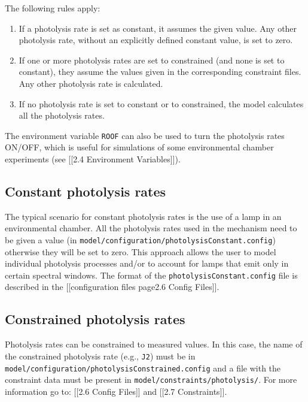 The following rules apply:

\begin{enumerate}
\def\labelenumi{\arabic{enumi}.}
\item
  If a photolysis rate is set as constant, it assumes the given value.
  Any other photolysis rate, without an explicitly defined constant
  value, is set to zero.
\item
  If one or more photolysis rates are set to constrained (and none is
  set to constant), they assume the values given in the corresponding
  constraint files. Any other photolysis rate is calculated.
\item
  If no photolysis rate is set to constant or to constrained, the model
  calculates all the photolysis rates.
\end{enumerate}

The environment variable \texttt{ROOF} can also be used to turn the
photolysis rates ON/OFF, which is useful for simulations of some
environmental chamber experiments (see {[}{[}2.4 Environment
Variables{]}{]}).

\subsection{Constant photolysis rates} \label{constant-photolysis-rates}

The typical scenario for constant photolysis rates is the use of a lamp
in an environmental chamber. All the photolysis rates used in the
mechanism need to be given a value (in
\texttt{model/configuration/photolysisConstant.config}) otherwise they
will be set to zero. This approach allows the user to model individual
photolysis processes and/or to account for lamps that emit only in
certain spectral windows. The format of the
\texttt{photolysisConstant.config} file is described in the
{[}{[}configuration files page\textbar{}2.6 Config Files{]}{]}.

\subsection{Constrained photolysis rates} \label{constrained-photolysis-rates}

Photolysis rates can be constrained to measured values. In this case,
the name of the constrained photolysis rate (e.g., \texttt{J2}) must be
in \texttt{model/configuration/photolysisConstrained.config} and a file
with the constraint data must be present in
\texttt{model/constraints/photolysis/}. For more information go to:
{[}{[}2.6 Config Files{]}{]} and {[}{[}2.7 Constraints{]}{]}.

